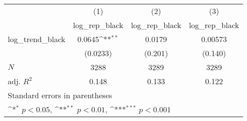 {
\def\sym#1{\ifmmode^{#1}\else\(^{#1}\)\fi}
\begin{tabular}{l*{3}{c}}
\hline\hline
            &\multicolumn{1}{c}{(1)}&\multicolumn{1}{c}{(2)}&\multicolumn{1}{c}{(3)}\\
            &\multicolumn{1}{c}{log\_rep\_black}&\multicolumn{1}{c}{log\_rep\_black}&\multicolumn{1}{c}{log\_rep\_black}\\
\hline
log\_trend\_black&      0.0645\sym{**} &      0.0179         &     0.00573         \\
            &    (0.0233)         &     (0.201)         &     (0.140)         \\
\hline
\(N\)       &        3288         &        3289         &        3289         \\
adj. \(R^{2}\)&       0.148         &       0.133         &       0.122         \\
\hline\hline
\multicolumn{4}{l}{\footnotesize Standard errors in parentheses}\\
\multicolumn{4}{l}{\footnotesize \sym{*} \(p<0.05\), \sym{**} \(p<0.01\), \sym{***} \(p<0.001\)}\\
\end{tabular}
}
